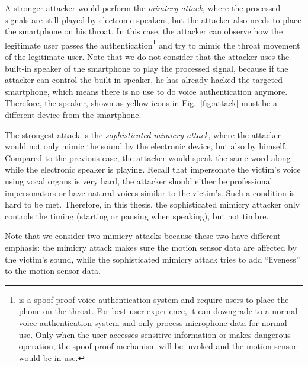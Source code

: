 A stronger attacker would perform the \textit{mimicry attack}, where the processed signals are still played by electronic speakers, but the attacker also needs to place the smartphone on his throat. In this case, the attacker can observe how the legitimate user passes the authentication\footnote{{\shortname} is a spoof-proof voice authentication system and require users to place the phone on the throat. For best user experience, it can downgrade to a normal voice authentication system and only process microphone data for normal use. Only when the user accesses sensitive information or makes dangerous operation, the spoof-proof mechanism will be invoked and the motion sensor would be in use.} and try to mimic the throat movement of the legitimate user. Note that we do not consider that the attacker uses the built-in speaker of the smartphone to play the processed signal, because if the attacker can control the built-in speaker, he has already hacked the targeted smartphone, which means there is no use to do voice authentication anymore. Therefore, the speaker, shown as yellow icons in Fig.~\ref{fig:attack} must be a different device from the smartphone.


The strongest attack is the \textit{sophisticated mimicry attack}, where the attacker would not only mimic the sound by the electronic device, but also by himself. Compared to the previous case, the attacker would speak the same word along while the electronic speaker is playing. Recall that impersonate the victim's voice using vocal organs is very hard, the attacker should either be professional impersonators or have natural voices similar to the victim's. Such a condition is hard to be met. Therefore, in this thesis, the sophisticated mimicry attacker only controls the timing (starting or pausing when speaking), but not timbre.

Note that we consider two mimicry attacks because these two have different emphasis: the 
mimicry attack makes sure the motion sensor data are affected by the victim's sound, while the sophisticated mimicry attack tries to add ``liveness'' to the motion sensor data. 
